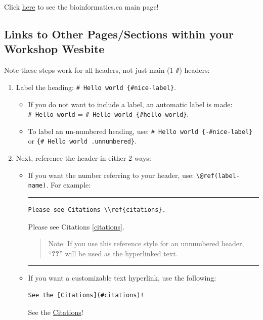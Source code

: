 \documentclass[
]{book}
\providecommand{\tightlist}{%
  \setlength{\itemsep}{0pt}\setlength{\parskip}{0pt}}
\theoremstyle{definition}
\theoremstyle{definition}
\theoremstyle{definition}
\theoremstyle{definition}
\theoremstyle{remark}
\begin{document}
Click \href{https://bioinformatics.ca/}{here} to see the bioinformatics.ca main page!

\subsection*{Links to Other Pages/Sections within your Workshop Wesbite}\label{links-to-other-pagessections-within-your-workshop-wesbite}

Note these steps work for all headers, not just main (1 \texttt{\#}) headers:

\begin{enumerate}
\def\labelenumi{\arabic{enumi}.}
\tightlist
\item
  Label the heading: \texttt{\#\ Hello\ world\ \{\#nice-label\}}.

  \begin{itemize}
  \tightlist
  \item
    If you do not want to include a label, an automatic label is made: \texttt{\#\ Hello\ world} = \texttt{\#\ Hello\ world\ \{\#hello-world\}}.
  \item
    To label an un-numbered heading, use: \texttt{\#\ Hello\ world\ \{-\#nice-label\}} or \texttt{\{\#\ Hello\ world\ .unnumbered\}}.
  \end{itemize}
\item
  Next, reference the header in either 2 ways:

  \begin{itemize}
  \item
    If you want the number referring to your header, use: \texttt{\textbackslash{}@ref(label-name)}. For example:

    \begin{center}\rule{0.5\linewidth}{0.5pt}\end{center}

\begin{verbatim}
Please see Citations \\ref{citations}.
\end{verbatim}

    Please see Citations \ref{citations}.

    \begin{quote}
    Note: If you use this reference style for an unnumbered header, ``\textbf{??}'' will be used as the hyperlinked text.
    \end{quote}

    \begin{center}\rule{0.5\linewidth}{0.5pt}\end{center}
  \item
    If you want a customizable text hyperlink, use the following:

\begin{verbatim}
See the [Citations](#citations)!
\end{verbatim}

    See the \hyperref[citations]{Citations}!
  \end{itemize}
\end{enumerate}
\end{document}
